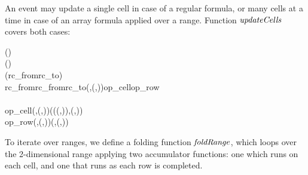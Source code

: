 An event may update a single cell in case of a regular formula, or many cells
at a time in case of an array formula applied over a range. Function
\ensuremath{\Varid{updateCells}} covers both cases:

\begin{hscode}\SaveRestoreHook
{}%
%
%
%
%
%
\>[B]{}\;\;(\;\;)\mathrel{=}{}\<[E]%
\\
\>[B]{}\<[4]%
\>[4]{}\;\;(\;)\;\<[E]%
\\[\blanklineskip]%
\>[B]{}\;\;(\;rc_{from}\;rc_{to}\;)\mathrel{=}{}\<[E]%
\\
\>[B]{}\<[4]%
\>[4]{}\mathbin{\$}\;rc_{from}\;rc_{from}\;rc_{to}\;(,(,))\;\;op_{cell}\;op_{row}{}\<[E]%
\\
\>[4]{}\<[7]%
\>[7]{}\<[E]%
\\
\>[7]{}\<[10]%
\>[10]{}op_{cell}\;(,(,))\;\<[37]%
\>[37]{}\mathrel{=}(\;\;(\;\;(,))\;,(\mathbin{+},)){}\<[E]%
\\
\>[7]{}\<[10]%
\>[10]{}op_{row}\;\anonymous \;\;(,(,)){}\<[37]%
\>[37]{}\mathrel{=}(,(,\mathbin{+})){}\<[E]%
\ColumnHook
\end{hscode}\resethooks

To iterate over ranges, we define a folding function \ensuremath{\Varid{foldRange}}, which
loops over the 2-dimensional range applying two accumulator functions: one
which runs on each cell, and one that runs as each row is completed.

